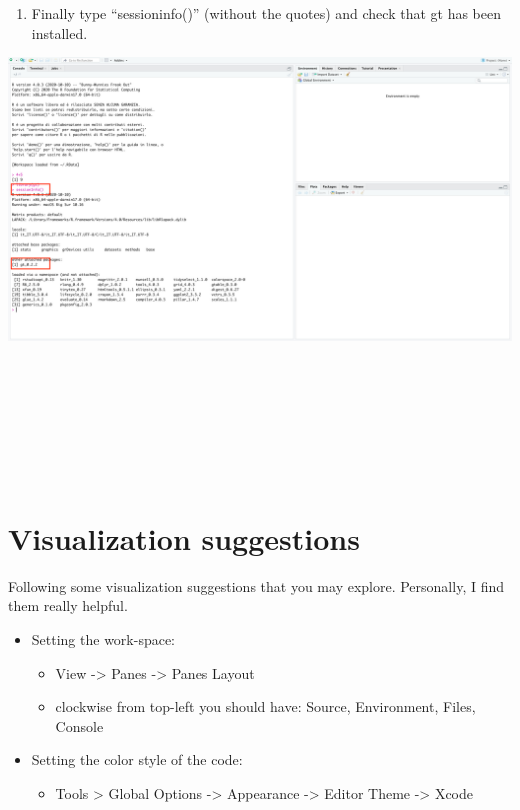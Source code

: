 \documentclass[
]{svmono}
\providecommand{\tightlist}{%
  \setlength{\itemsep}{0pt}\setlength{\parskip}{0pt}}
\begin{document}
\begin{enumerate}
\def\labelenumi{\arabic{enumi}.}
\setcounter{enumi}{8}
\tightlist
\item
  Finally type ``sessioninfo()'' (without the quotes) and check that gt has been installed.\\
\end{enumerate}

\begin{center}\includegraphics[width=0.8\linewidth,]{images/pkg3} \end{center}

~

~

~

~

\hypertarget{visualization-suggestions}{%
\section{Visualization suggestions}\label{visualization-suggestions}}

Following some visualization suggestions that you may explore.
Personally, I find them really helpful.

\begin{itemize}
\item
  Setting the work-space:

  \begin{itemize}
  \tightlist
  \item
    View -\textgreater{} Panes -\textgreater{} Panes Layout\\
  \item
    clockwise from top-left you should have: Source, Environment,
    Files, Console
  \end{itemize}
\item
  Setting the color style of the code:

  \begin{itemize}
  \tightlist
  \item
    Tools \textgreater{} Global Options -\textgreater{} Appearance -\textgreater{} Editor Theme -\textgreater{}
    Xcode
  \end{itemize}
\end{itemize}
\end{document}
